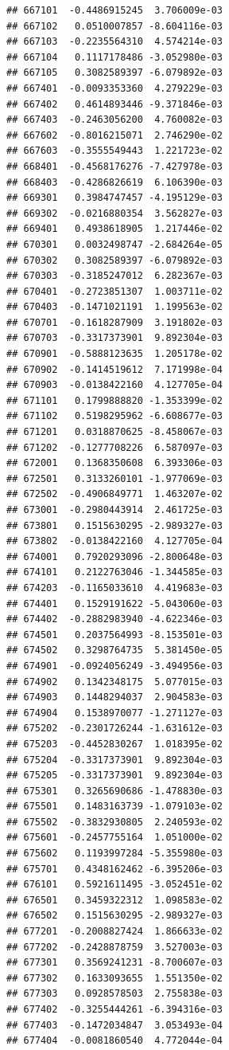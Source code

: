 \documentclass[ignorenonframetext,]{beamer}
\begin{document}
\begin{frame}[fragile]
\begin{verbatim}
## 667101  -0.4486915245  3.706009e-03
## 667102   0.0510007857 -8.604116e-03
## 667103  -0.2235564310  4.574214e-03
## 667104   0.1117178486 -3.052980e-03
## 667105   0.3082589397 -6.079892e-03
## 667401  -0.0093353360  4.279229e-03
## 667402   0.4614893446 -9.371846e-03
## 667403  -0.2463056200  4.760082e-03
## 667602  -0.8016215071  2.746290e-02
## 667603  -0.3555549443  1.221723e-02
## 668401  -0.4568176276 -7.427978e-03
## 668403  -0.4286826619  6.106390e-03
## 669301   0.3984747457 -4.195129e-03
## 669302  -0.0216880354  3.562827e-03
## 669401   0.4938618905  1.217446e-02
## 670301   0.0032498747 -2.684264e-05
## 670302   0.3082589397 -6.079892e-03
## 670303  -0.3185247012  6.282367e-03
## 670401  -0.2723851307  1.003711e-02
## 670403  -0.1471021191  1.199563e-02
## 670701  -0.1618287909  3.191802e-03
## 670703  -0.3317373901  9.892304e-03
## 670901  -0.5888123635  1.205178e-02
## 670902  -0.1414519612  7.171998e-04
## 670903  -0.0138422160  4.127705e-04
## 671101   0.1799888820 -1.353399e-02
## 671102   0.5198295962 -6.608677e-03
## 671201   0.0318870625 -8.458067e-03
## 671202  -0.1277708226  6.587097e-03
## 672001   0.1368350608  6.393306e-03
## 672501   0.3133260101 -1.977069e-03
## 672502  -0.4906849771  1.463207e-02
## 673001  -0.2980443914  2.461725e-03
## 673801   0.1515630295 -2.989327e-03
## 673802  -0.0138422160  4.127705e-04
## 674001   0.7920293096 -2.800648e-03
## 674101   0.2122763046 -1.344585e-03
## 674203  -0.1165033610  4.419683e-03
## 674401   0.1529191622 -5.043060e-03
## 674402  -0.2882983940 -4.622346e-03
## 674501   0.2037564993 -8.153501e-03
## 674502   0.3298764735  5.381450e-05
## 674901  -0.0924056249 -3.494956e-03
## 674902   0.1342348175  5.077015e-03
## 674903   0.1448294037  2.904583e-03
## 674904   0.1538970077 -1.271127e-03
## 675202  -0.2301726244 -1.631612e-03
## 675203  -0.4452830267  1.018395e-02
## 675204  -0.3317373901  9.892304e-03
## 675205  -0.3317373901  9.892304e-03
## 675301   0.3265690686 -1.478830e-03
## 675501   0.1483163739 -1.079103e-02
## 675502  -0.3832930805  2.240593e-02
## 675601  -0.2457755164  1.051000e-02
## 675602   0.1193997284 -5.355980e-03
## 675701   0.4348162462 -6.395206e-03
## 676101   0.5921611495 -3.052451e-02
## 676501   0.3459322312  1.098583e-02
## 676502   0.1515630295 -2.989327e-03
## 677201  -0.2008827424  1.866633e-02
## 677202  -0.2428878759  3.527003e-03
## 677301   0.3569241231 -8.700607e-03
## 677302   0.1633093655  1.551350e-02
## 677303   0.0928578503  2.755838e-03
## 677402  -0.3255444261 -6.394316e-03
## 677403  -0.1472034847  3.053493e-04
## 677404  -0.0081860540  4.772044e-04

\end{verbatim}
\end{frame}
\end{document}
